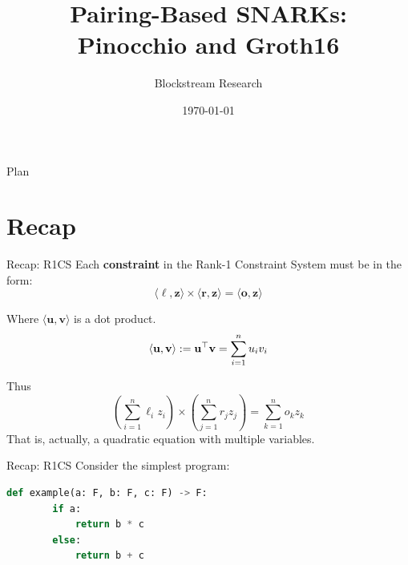 \documentclass{zkdl-presentation-template}
\title[Groth16]{\textbf{Pairing-Based SNARKs:\\Pinocchio and Groth16}}
\author{Blockstream Research}
\date{\today}
\begin{document}
    \maketitleframe

    \begin{frame}{Plan}
        \tableofcontents
    \end{frame}

    \section{Recap}

    \begin{frame}{Recap: R1CS}
        Each \textbf{constraint} in the Rank-1 Constraint System must be in the form:
        \begin{equation*}
            \langle \boldsymbol{\ell}, \mathbf{z}\rangle \times \langle \boldsymbol{r}, \mathbf{z}\rangle = \langle \boldsymbol{o}, \mathbf{z}\rangle
        \end{equation*}\pause

        Where $\langle \mathbf{u}, \mathbf{v}\rangle$ is a dot product.
        \vspace{-10pt}
        \begin{equation*}
            \langle \mathbf{u}, \mathbf{v} \rangle := \mathbf{u}^{\top}\mathbf{v} = \sum_{i=1}^{n} u_i v_i
            \vspace{-5pt}
        \end{equation*}\pause

        Thus
        \vspace{-5pt}
        \begin{equation*}
            \left(\sum_{i=1}^{n} \ell_i z_i\right) \times \left(\sum_{j=1}^{n} r_j z_j\right) = \sum_{k=1}^{n} o_k z_k
        \end{equation*}
        That is, actually, a quadratic equation with multiple variables.
    \end{frame}

    \begin{frame}[fragile]{Recap: R1CS}
        Consider the simplest program:
        \vspace{10pt}
        \begin{lstlisting}[language=Python,numbers=none]
    def example(a: F, b: F, c: F) -> F:
        if a:
            return b * c
        else:
            return b + c
        \end{lstlisting}
    \end{frame}
\end{document}
